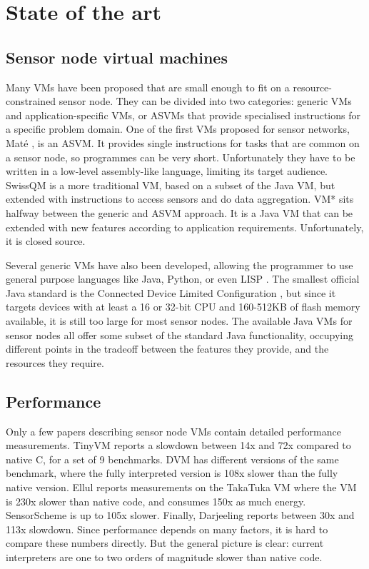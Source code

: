 \chapter{State of the art}

\section{Sensor node virtual machines}
Many VMs have been proposed that are small enough to fit on a resource-constrained sensor node. They can be divided into two categories: generic VMs and application-specific VMs, or ASVMs \cite{Culler05} that provide specialised instructions for a specific problem domain. One of the first VMs proposed for sensor networks, Mat\'e \cite{Levis:2002ku}, is an ASVM. It provides single instructions for tasks that are common on a sensor node, so programmes can be very short. Unfortunately they have to be written in a low-level assembly-like language, limiting its target audience. SwissQM \cite{Muller:2007fs} is a more traditional VM, based on a subset of the Java VM, but extended with instructions to access sensors and do data aggregation. VM* \cite{Koshy:2005ww} sits halfway between the generic and ASVM approach. It is a Java VM that can be extended with new features according to application requirements. Unfortunately, it is closed source.

Several generic VMs have also been developed, allowing the programmer to use general purpose languages like Java, Python, or even LISP \cite{Harbaum, Brouwers:2009cj, Aslam:2008, Evers:2010}. The smallest official Java standard is the Connected Device Limited Configuration \cite{CLDC}, but since it targets devices with at least a 16 or 32-bit CPU and 160-512KB of flash memory available, it is still too large for most sensor nodes. The available Java VMs for sensor nodes all offer some subset of the standard Java functionality, occupying different points in the tradeoff between the features they provide, and the resources they require.



\section{Performance}
Only a few papers describing sensor node VMs contain detailed performance measurements. TinyVM \cite{Hong:2009gc} reports a slowdown between 14x and 72x compared to native C, for a set of 9 benchmarks. DVM \cite{Balani:2006} has different versions of the same benchmark, where the fully interpreted version is 108x slower than the fully native version. Ellul reports measurements on the TakaTuka VM \cite{Aslam:2008, Ellul:2012thesis} where the VM is 230x slower than native code, and consumes 150x as much energy. SensorScheme \cite{Evers:2010} is up to 105x slower. Finally, Darjeeling \cite{Brouwers:2009cj} reports between 30x and 113x slowdown. Since performance depends on many factors, it is hard to compare these numbers directly. But the general picture is clear: current interpreters are one to two orders of magnitude slower than native code.


